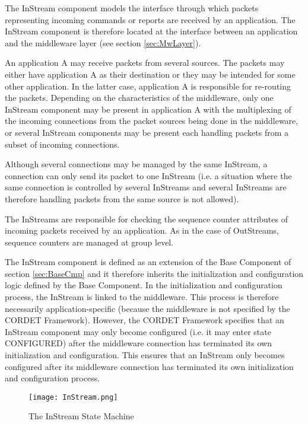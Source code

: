 The InStream component models the interface through which packets representing incoming commands or reports are received by an application. The InStream component is therefore located at the interface between an application and the middleware layer (see section \ref{sec:MwLayer}). 

An application A may receive packets from several sources. The packets may either have application A as their destination or they may be intended for some other application. In the latter case, application A is responsible for re-routing the packets. Depending on the characteristics of the middleware, only one InStream component may be present in application A with the multiplexing of the incoming connections from the packet sources being done in the middleware, or several InStream components may be present each handling packets from a subset of incoming connections. 

Although several connections may be managed by the same InStream, a connection can only send its packet to one InStream (i.e. a situation where the same connection is controlled by several InStreams and several InStreams are therefore handling packets from the same source is not allowed).

The InStreams are responsible for checking the sequence counter attributes of incoming packets received by an application. As in the case of OutStreams, sequence counters are managed at group level. 

The InStream component is defined as an extension of the Base Component of section \ref{sec:BaseCmp} and it therefore inherits the initialization and configuration logic defined by the Base Component. In the initialization and configuration process, the InStream is linked to the middleware. This process is therefore necessarily application-specific (because the middleware is not specified by the CORDET Framework). However, the CORDET Framework specifies that an InStream component may only become configured (i.e. it may enter state CONFIGURED) after the middleware connection has terminated its own initialization and configuration. This ensures that an InStream only becomes configured after its middleware connection has terminated its own initialization and configuration process.

\begin{figure}[ht]
 \centering
 \texttt{[image: InStream.png]}
 \caption{The InStream State Machine}
 \label{fig:InStream}
\end{figure}

